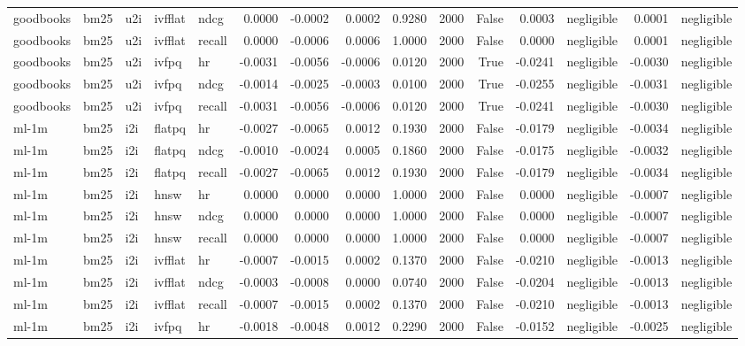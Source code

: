 \begin{tabular}{lllllrrrrrrrlrl}
goodbooks & bm25 & u2i & ivfflat & ndcg & 0.0000 & -0.0002 & 0.0002 & 0.9280 & 2000 & False & 0.0003 & negligible & 0.0001 & negligible \\
goodbooks & bm25 & u2i & ivfflat & recall & 0.0000 & -0.0006 & 0.0006 & 1.0000 & 2000 & False & 0.0000 & negligible & 0.0001 & negligible \\
goodbooks & bm25 & u2i & ivfpq & hr & -0.0031 & -0.0056 & -0.0006 & 0.0120 & 2000 & True & -0.0241 & negligible & -0.0030 & negligible \\
goodbooks & bm25 & u2i & ivfpq & ndcg & -0.0014 & -0.0025 & -0.0003 & 0.0100 & 2000 & True & -0.0255 & negligible & -0.0031 & negligible \\
goodbooks & bm25 & u2i & ivfpq & recall & -0.0031 & -0.0056 & -0.0006 & 0.0120 & 2000 & True & -0.0241 & negligible & -0.0030 & negligible \\
ml-1m & bm25 & i2i & flatpq & hr & -0.0027 & -0.0065 & 0.0012 & 0.1930 & 2000 & False & -0.0179 & negligible & -0.0034 & negligible \\
ml-1m & bm25 & i2i & flatpq & ndcg & -0.0010 & -0.0024 & 0.0005 & 0.1860 & 2000 & False & -0.0175 & negligible & -0.0032 & negligible \\
ml-1m & bm25 & i2i & flatpq & recall & -0.0027 & -0.0065 & 0.0012 & 0.1930 & 2000 & False & -0.0179 & negligible & -0.0034 & negligible \\
ml-1m & bm25 & i2i & hnsw & hr & 0.0000 & 0.0000 & 0.0000 & 1.0000 & 2000 & False & 0.0000 & negligible & -0.0007 & negligible \\
ml-1m & bm25 & i2i & hnsw & ndcg & 0.0000 & 0.0000 & 0.0000 & 1.0000 & 2000 & False & 0.0000 & negligible & -0.0007 & negligible \\
ml-1m & bm25 & i2i & hnsw & recall & 0.0000 & 0.0000 & 0.0000 & 1.0000 & 2000 & False & 0.0000 & negligible & -0.0007 & negligible \\
ml-1m & bm25 & i2i & ivfflat & hr & -0.0007 & -0.0015 & 0.0002 & 0.1370 & 2000 & False & -0.0210 & negligible & -0.0013 & negligible \\
ml-1m & bm25 & i2i & ivfflat & ndcg & -0.0003 & -0.0008 & 0.0000 & 0.0740 & 2000 & False & -0.0204 & negligible & -0.0013 & negligible \\
ml-1m & bm25 & i2i & ivfflat & recall & -0.0007 & -0.0015 & 0.0002 & 0.1370 & 2000 & False & -0.0210 & negligible & -0.0013 & negligible \\
ml-1m & bm25 & i2i & ivfpq & hr & -0.0018 & -0.0048 & 0.0012 & 0.2290 & 2000 & False & -0.0152 & negligible & -0.0025 & negligible \\

\end{tabular}
